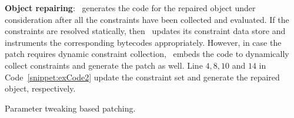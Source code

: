 \begin{mylist}

 \item \textbf{Object repairing}: \tool\ generates the code for the repaired
object under consideration after all the constraints have been collected and
evaluated. If the constraints are resolved statically, then \tool\ updates its
constraint data store and instruments the corresponding bytecodes appropriately.
However, in case the patch requires dynamic constraint collection, \tool\ embeds
the code to dynamically collect constraints and generate the patch as well. Line
$4, 8, 10$ and $14$ in Code~\ref{snippet:exCode2} update the constraint set and
generate the repaired object, respectively.

\begin{algorithm}[t]
\scriptsize
\DontPrintSemicolon
{}
\caption{Parameter tweaking based  patching.}
\label{algo:stringPatchParametr}
\end{algorithm}


\end{mylist}
